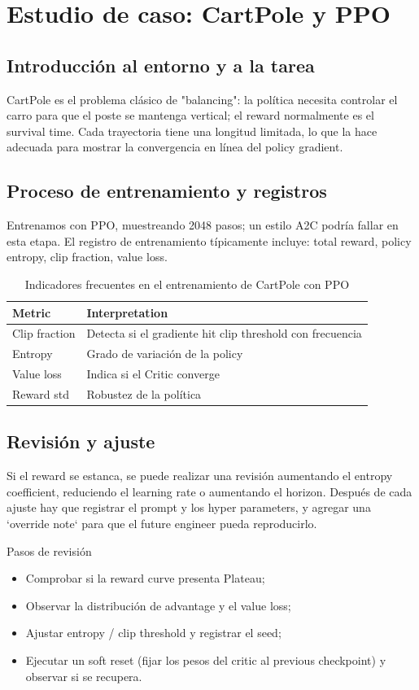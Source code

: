 \section{Estudio de caso: CartPole y PPO}
\subsection{Introducción al entorno y a la tarea}
CartPole es el problema clásico de "balancing": la política necesita controlar el carro para que el poste se mantenga vertical; el reward normalmente es el survival time. Cada trayectoria tiene una longitud limitada, lo que la hace adecuada para mostrar la convergencia en línea del policy gradient.

\subsection{Proceso de entrenamiento y registros}
Entrenamos con PPO, muestreando 2048 pasos; un estilo A2C podría fallar en esta etapa. El registro de entrenamiento típicamente incluye: total reward, policy entropy, clip fraction, value loss.
\begin{table}[H]
\centering
\small
\begin{tabular}{p{}p{}}
\toprule
Metric & Interpretation \\
\midrule
Clip fraction & Detecta si el gradiente hit clip threshold con frecuencia \\
Entropy & Grado de variación de la policy \\
Value loss & Indica si el Critic converge \\
Reward std & Robustez de la política \\
\bottomrule
\end{tabular}
\caption{Indicadores frecuentes en el entrenamiento de CartPole con PPO}
\end{table}

\subsection{Revisión y ajuste}
Si el reward se estanca, se puede realizar una revisión aumentando el entropy coefficient, reduciendo el learning rate o aumentando el horizon. Después de cada ajuste hay que registrar el prompt y los hyper parameters, y agregar una `override note` para que el future engineer pueda reproducirlo.

\begin{knowledgebox}{Pasos de revisión}
\begin{itemize}
    \item Comprobar si la reward curve presenta Plateau;
    \item Observar la distribución de advantage y el value loss;
\item Ajustar entropy / clip threshold y registrar el seed;
\item Ejecutar un soft reset (fijar los pesos del critic al previous checkpoint) y observar si se recupera.
\end{itemize}
\end{knowledgebox}

